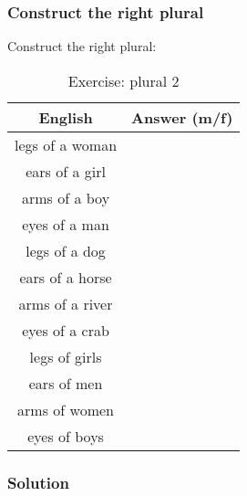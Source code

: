 \newpage
\subsubsection{Construct the right plural}

Construct the right plural:
\begin{table}[H]
\centering
\begin{tabular}{|c|M{10.0cm}|}
  \toprule
  \textbf{English} & \textbf{Answer (m/f)}\\
  \toprule
  legs of a woman & \\
  \midrule
  ears of a girl & \\
  \midrule
  arms of a boy & \\
  \midrule
  eyes of a man & \\
  \midrule
  legs of a dog & \\
  \midrule
  ears of a horse & \\
  \midrule
  arms of a river & \\
  \midrule
  eyes of a crab & \\
  \midrule
  legs of girls & \\
  \midrule
  ears of men & \\
  \midrule
  arms of women & \\
  \midrule
  eyes of boys & \\
  \bottomrule
\end{tabular}
\label{exercise_plural_2}
\caption{Exercise: plural 2}
\end{table}

\newpage
\subsubsection{Solution}

